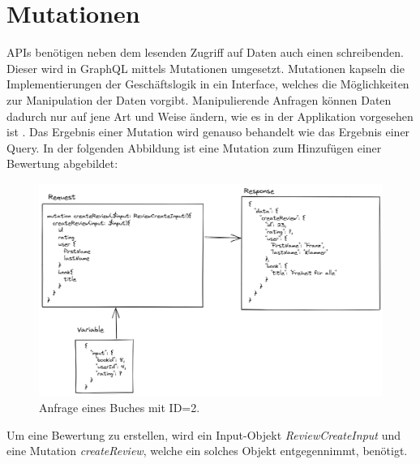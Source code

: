
\section{Mutationen}
APIs benötigen neben dem lesenden Zugriff auf Daten auch einen schreibenden.
Dieser wird in GraphQL mittels Mutationen umgesetzt.
Mutationen kapseln die Implementierungen der Geschäftslogik in ein Interface, welches die Möglichkeiten zur Manipulation der Daten vorgibt.
Manipulierende Anfragen können Daten dadurch nur auf jene Art und Weise ändern, wie es in der Applikation vorgesehen ist \parencite[S. 54]{kress2020graphql}.
Das Ergebnis einer Mutation wird genauso behandelt wie das Ergebnis einer Query.
\newline
In der folgenden Abbildung ist eine Mutation zum Hinzufügen einer Bewertung abgebildet:

\begin{figure}[H]
    \includegraphics[width=\textwidth]{pics/createReviewMutation.png}
    \caption{Anfrage eines Buches mit ID=2.}
\end{figure}

Um eine Bewertung zu erstellen, wird ein Input-Objekt \textit{ReviewCreateInput} und eine Mutation \textit{createReview}, welche ein solches Objekt entgegennimmt, benötigt.

